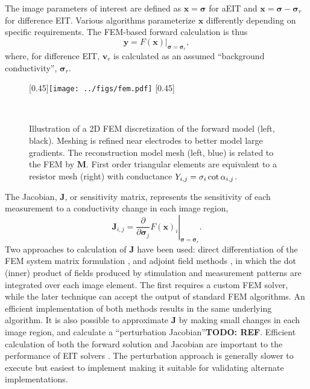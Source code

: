\documentclass[12pt]{article} \usepackage[margin=3cm]{geometry} \usepackage[margin=20pt,font=small,labelfont=bf]{caption}\def\TBLWIDA{35mm}\def\TBLWIDB{95mm}
\newcommand{\TODO}[1]{{\bf TODO: #1}}
\newcommand{\xB}{\mathbf{x}}
\newcommand{\yB}{\mathbf{y}}
\newcommand{\vB}{\mathbf{v}}
\newcommand{\MB}{\mathbf{M}}
\newcommand{\JB}{\mathbf{J}}
\newcommand{\sG}{\bm{\sigma}}
\begin{document}
The image parameters of interest are defined as $\xB = \sG$ for aEIT and
$\xB = \sG - \sG_r$ for difference EIT. Various algorithms parameterize
$\xB$ differently depending on specific requirements.
The FEM-based forward calculation is thus
\begin{equation}
\yB = \left. F(\xB) \right|_{\sG = \sG_r},
\end{equation}
where, for difference EIT, $\vB_r$ is calculated as an assumed
``background conductivity'', $\sG_r$.

\begin{figure} \centering
   [0.45\columnwidth]{\texttt{[image: ../figs/fem.pdf]}}\hfil
   [0.45\columnwidth]{
   }\\
\caption{%
Illustration of a 2D FEM discretization of the forward model (left, black).
Meshing is refined near electrodes to better model large gradients.
The reconstruction model mesh (left, blue) is related to the FEM by 
$\MB$. 
   First order triangular elements are equivalent to a resistor mesh (right)
with conductance $Y_{i,j} = \sigma_i \mathop{\rm cot} \alpha_{i,j}$.
}
\label{fig:FEM_mapping}
\end{figure}

The Jacobian, $\JB$, or sensitivity matrix, represents
the sensitivity of each measurement to a conductivity 
change in each image region,
\begin{equation}
\JB_{i,j} = \left. 
 \frac{\partial}
           {\partial \sG_j} F( \xB )_i 
\right|_{\sG = \sG_r}.
\end{equation}
Two approaches to calculation of $\JB$ have been used:
direct differentiation of the FEM system matrix
formulation \cite{Yorkey1987Comparing}, and
adjoint field methods \cite{Polydorides2002EIDORS},
 in which the dot (inner) product of
fields produced by stimulation and measurement patterns
are integrated over each image element.
The first requires a custom FEM solver, while the
later technique can accept the output of standard FEM algorithms.
An efficient implementation of both methods results
in the same underlying algorithm\cite{Adler2017Jacobian}.
It is also possible to approximate $\JB$ 
by making small changes in each image region, and calculate a ``perturbation
Jacobian''\TODO{REF}.  Efficient calculation of both the forward solution and
Jacobian are important to the performance of EIT solvers \cite{Boyle2012Compute}.
The perturbation approach is generally slower to execute but easiest to
implement making it suitable for validating alternate implementations.
\end{document}
